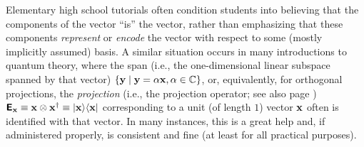 Elementary high school tutorials often condition students into believing that the components of the vector
``is'' the vector, rather than emphasizing that these components {\em represent} or {\em encode}
the vector with respect to some (mostly implicitly assumed) basis.
A similar situation occurs in many introductions to quantum theory,
where the span
(i.e., the one-dimensional linear subspace spanned by that vector)
$\{
{\bf y}
\mid
{\bf y} = \alpha {\bf x}, \alpha \in {\Bbb C}
\}$, or, equivalently,  for orthogonal projections,
the {\em projection} (i.e., the projection operator; see also page \pageref{2011-m-projec})
$\textsf{\textbf{E}}_{\bf x} \equiv {\bf x} \otimes {\bf x}^\dagger  \equiv \vert {\bf x} \rangle \langle {\bf x}\vert$
corresponding to a unit (of length $1$) vector ${\bf x}$
often is identified with that vector.
In many instances, this is a great help and,
if administered properly, is consistent and fine (at least for all practical purposes).

